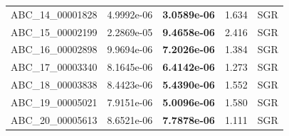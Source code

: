 \begin{table}[t]
\begin{tabular}{lrrrr}
ABC\_14\_00001828 & 4.9992e-06 & \textbf{3.0589e-06} & 1.634 & SGR \\
ABC\_15\_00002199 & 2.2869e-05 & \textbf{9.4658e-06} & 2.416 & SGR \\
ABC\_16\_00002898 & 9.9694e-06 & \textbf{7.2026e-06} & 1.384 & SGR \\
ABC\_17\_00003340 & 8.1645e-06 & \textbf{6.4142e-06} & 1.273 & SGR \\
ABC\_18\_00003838 & 8.4423e-06 & \textbf{5.4390e-06} & 1.552 & SGR \\
ABC\_19\_00005021 & 7.9151e-06 & \textbf{5.0096e-06} & 1.580 & SGR \\
ABC\_20\_00005613 & 8.6521e-06 & \textbf{7.7878e-06} & 1.111 & SGR \\
\bottomrule
\end{tabular}
\end{table}
